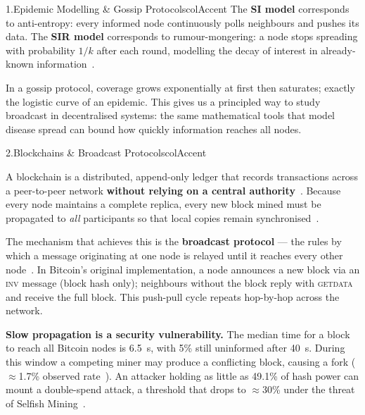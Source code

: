 \documentclass[final]{beamer}
\newcommand{\pbody}{\fontsize{21}{27}\selectfont}
\newlength{\colwidth}
\begin{document}
\begin{frame}[t]
\begin{columns}[T, totalwidth=0.97\paperwidth]
\begin{column}{\colwidth}
\begin{panel}{1.\enspace Epidemic Modelling \& Gossip Protocols}{colAccent}
  The \textbf{SI model} corresponds to anti-entropy: every informed node continuously polls neighbours and pushes its data. The \textbf{SIR model} corresponds to rumour-mongering: a node stops spreading with probability $1/k$ after each round, modelling the decay of interest in already-known information~\cite{demers1987}.

  \vspace{7pt}
  In a gossip protocol, coverage grows exponentially at first then saturates; exactly the logistic curve of an epidemic. This gives us a principled way to study broadcast in decentralised systems: the same mathematical tools that model disease spread can bound how quickly information reaches all nodes.
\end{panel}


\vspace{6mm}


\begin{panel}{2.\enspace Blockchains \& Broadcast Protocols}{colAccent}
  \pbody\justifying

  A blockchain is a distributed, append-only ledger that records transactions across a peer-to-peer network \textbf{without relying on a central authority}~\cite{nakamoto2008}. Because every node maintains a complete replica, every new block mined must be propagated to \emph{all} participants so that local copies remain synchronised~\cite{decker2013}. 

  \vspace{7pt}

  The mechanism that achieves this is the \textbf{broadcast protocol} --- the rules by which a message originating at one node is relayed until it reaches every other node~\cite{decker2013}. In Bitcoin's original implementation, a node announces a new block via an \textsc{inv} message (block hash only); neighbours without the block reply with \textsc{getdata} and receive the full block. This push-pull cycle repeats hop-by-hop across the network.

  \vspace{7pt}

  \textbf{Slow propagation is a security vulnerability.} The median time for a block to reach all Bitcoin nodes is 6.5~s, with 5\% still uninformed after 40~s. During this window a competing miner may produce a conflicting block, causing a fork ($\approx$1.7\% observed rate~\cite{decker2013}). An attacker holding as little as 49.1\% of hash power can mount a double-spend attack, a threshold that drops to $\approx$30\% under the threat of Selfish Mining~\cite{eyal2013}.
\end{panel}



\end{column}
\end{columns}
\end{frame}
\end{document}
